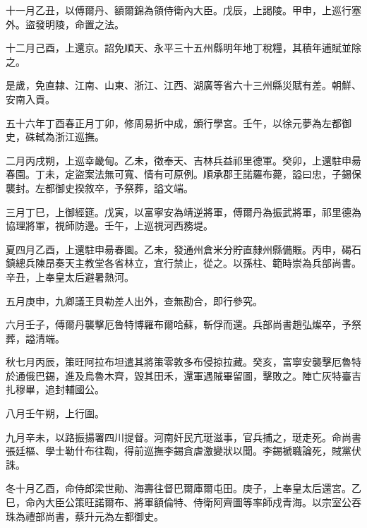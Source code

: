 \begin{pinyinscope}
十一月乙丑，以傅爾丹、額爾錦為領侍衛內大臣。戊辰，上謁陵。甲申，上巡行塞外。盜發明陵，命置之法。

十二月己酉，上還京。詔免順天、永平三十五州縣明年地丁稅糧，其積年逋賦並除之。

是歲，免直隸、江南、山東、浙江、江西、湖廣等省六十三州縣災賦有差。朝鮮、安南入貢。

五十六年丁酉春正月丁卯，修周易折中成，頒行學宮。壬午，以徐元夢為左都御史，硃軾為浙江巡撫。

二月丙戌朔，上巡幸畿甸。乙未，徵奉天、吉林兵益祁里德軍。癸卯，上還駐申昜春園。丁未，定盜案法無可寬、情有可原例。順承郡王諾羅布薨，謚曰忠，子錫保襲封。左都御史揆敘卒，予祭葬，謚文端。

三月丁巳，上御經筵。戊寅，以富寧安為靖逆將軍，傅爾丹為振武將軍，祁里德為協理將軍，視師防邊。壬午，上巡視河西務堤。

夏四月乙酉，上還駐申昜春園。乙未，發通州倉米分貯直隸州縣備賑。丙申，碣石鎮總兵陳昂奏天主教堂各省林立，宜行禁止，從之。以孫柱、範時崇為兵部尚書。辛丑，上奉皇太后避暑熱河。

五月庚申，九卿議王貝勒差人出外，查無勘合，即行參究。

六月壬子，傅爾丹襲擊厄魯特博羅布爾哈蘇，斬俘而還。兵部尚書趙弘燦卒，予祭葬，謚清端。

秋七月丙辰，策旺阿拉布坦遣其將策零敦多布侵掠拉藏。癸亥，富寧安襲擊厄魯特於通俄巴錫，進及烏魯木齊，毀其田禾，還軍遇賊畢留圖，擊敗之。陣亡灰特臺吉扎穆畢，追封輔國公。

八月壬午朔，上行圍。

九月辛未，以路振揚署四川提督。河南奸民亢珽滋事，官兵捕之，珽走死。命尚書張廷樞、學士勒什布往鞫，得前巡撫李錫貪虐激變狀以聞。李錫褫職論死，賊黨伏誅。

冬十月乙酉，命侍郎梁世勛、海壽往督巴爾庫爾屯田。庚子，上奉皇太后還宮。乙巳，命內大臣公策旺諾爾布、將軍額倫特、侍衛阿齊圖等率師戍青海。以宗室公吞珠為禮部尚書，蔡升元為左都御史。


\end{pinyinscope}
